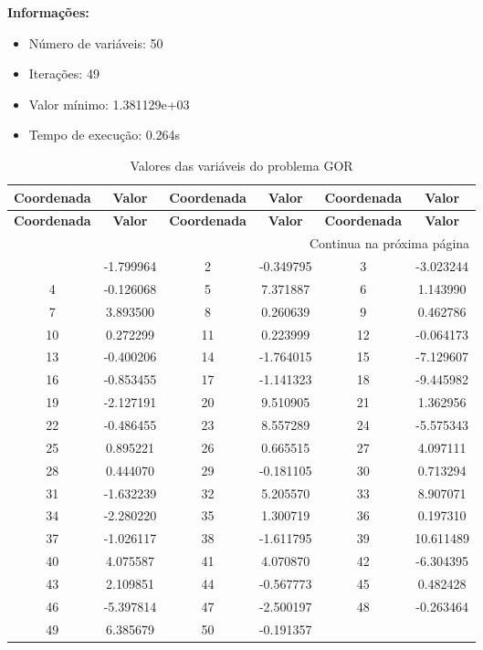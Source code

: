 \documentclass[12pt]{article}
\begin{document}
\textbf{Informações:}
\begin{itemize}
\item Número de variáveis: 50
\item Iterações: 49
\item Valor mínimo: 1.381129e+03
\item Tempo de execução: 0.264s
\end{itemize}

\small
\begin{longtable}{@{}cc|cc|cc@{}}
\caption{Valores das variáveis do problema GOR} \\
\toprule
\textbf{Coordenada} & \textbf{Valor} & \textbf{Coordenada} & \textbf{Valor} & \textbf{Coordenada} & \textbf{Valor} \\
\midrule
\endfirsthead

\toprule
\textbf{Coordenada} & \textbf{Valor} & \textbf{Coordenada} & \textbf{Valor} & \textbf{Coordenada} & \textbf{Valor} \\
\midrule
\endhead

\midrule \multicolumn{6}{r}{{Continua na próxima página}} \\ \midrule
\endfoot

\bottomrule
\endlastfoot
1 & -1.799964 & 2 & -0.349795 & 3 & -3.023244 \\
4 & -0.126068 & 5 & 7.371887 & 6 & 1.143990 \\
7 & 3.893500 & 8 & 0.260639 & 9 & 0.462786 \\
10 & 0.272299 & 11 & 0.223999 & 12 & -0.064173 \\
13 & -0.400206 & 14 & -1.764015 & 15 & -7.129607 \\
16 & -0.853455 & 17 & -1.141323 & 18 & -9.445982 \\
19 & -2.127191 & 20 & 9.510905 & 21 & 1.362956 \\
22 & -0.486455 & 23 & 8.557289 & 24 & -5.575343 \\
25 & 0.895221 & 26 & 0.665515 & 27 & 4.097111 \\
28 & 0.444070 & 29 & -0.181105 & 30 & 0.713294 \\
31 & -1.632239 & 32 & 5.205570 & 33 & 8.907071 \\
34 & -2.280220 & 35 & 1.300719 & 36 & 0.197310 \\
37 & -1.026117 & 38 & -1.611795 & 39 & 10.611489 \\
40 & 4.075587 & 41 & 4.070870 & 42 & -6.304395 \\
43 & 2.109851 & 44 & -0.567773 & 45 & 0.482428 \\
46 & -5.397814 & 47 & -2.500197 & 48 & -0.263464 \\
49 & 6.385679 & 50 & -0.191357 &  &  \\

\end{longtable}
\end{document}
